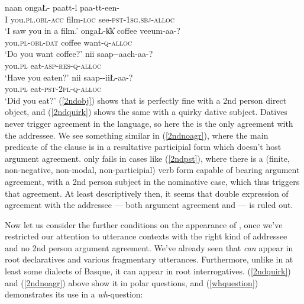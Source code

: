 \documentclass[output=paper, modfonts, nonflat]{langsci/langscibook}
\begin{document}
\ea\label{2ndarg}
  \ea
    \label{2ndobj}\gll naan onga\L-\A{} pa\D att-l\A{} paa-tt-een-\nga\\
    I you.\textsc{pl}.\textsc{obl}-\textsc{acc}{} film-\textsc{loc}{} see-\textsc{pst}-1\textsc{sg}.\textsc{sbj}-\textsc{alloc}\\
    \glt `I saw you in a film.'
  \ex
    \label{2ndquirk}\gll onga\L-\U kk\U{} coffee vee\textrtailn um-aa-\nga?\\
    you.\textsc{pl}-\textsc{obl}-\textsc{dat}{} coffee want-\textsc{q}-\textsc{alloc}\\
    \glt `Do you want coffee?'
  \ex
    \label{2ndnoagr}\gll nii\nga{} saap-\textrtailt-aach-aa-\nga?\\
    you.\textsc{pl}{} eat-\textsc{asp}-\textsc{res}-\textsc{q}-\textsc{alloc}\\
    \glt `Have you eaten?'
  \ex
    \label{2ndpst}\gll *nii\nga{} saap-\textrtailt-ii\nga\L-aa-\nga?\\
    you.\textsc{pl}{} eat-\textsc{pst}-2\textsc{pl}-\textsc{q}-\textsc{alloc}\\
    \glt `Did you eat?'
  \z
\z
%
(\ref{2ndobj}) shows that \allagr{} is perfectly fine with a 2nd
person direct object, and (\ref{2ndquirk}) shows the same with a
quirky dative subject. Datives never trigger agreement in the
language, so here the \allagr{} is the only agreement with the
addressee. We see something similar in (\ref{2ndnoagr}), where the
main predicate of the clause is in a resultative participial form
which doesn't host argument agreement. \allagr{} only fails in cases
like (\ref{2ndpst}), where there is a (finite, non-negative,
non-modal, non-participial) verb form capable of bearing argument
agreement, with a 2nd person subject in the nominative case, which
thus triggers that agreement. At least descriptively then, it seems
that double expression of agreement with the addressee --- both
argument agreement and \allagr{} --- is ruled out.%


Now let us consider the further conditions on the appearance of
\allagr, once we've restricted our attention to utterance contexts
with the right kind of addressee and no 2nd person argument agreement.
We've already seen that \allagr{} \emph{can} appear in root
declaratives and various fragmentary utterances. Furthermore, unlike
in at least some dialects of Basque, it can appear in root
interrogatives. (\ref{2ndquirk}) and (\ref{2ndnoagr}) above show it in
polar questions, and (\ref{whquestion}) demonstrates its use in a
\textit{wh}-question:
\end{document}
